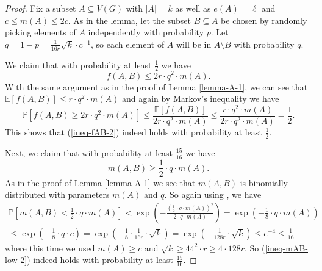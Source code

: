 \begin{proof}Fix a subset $A\subseteq V(G)$ with $\vert A\vert=k$ as well as $e(A)=\ell$ and $c\leq m(A)\leq 2c$. As in the lemma, let the subset $B\subseteq A$ be chosen by randomly picking elements of $A$ independently with probability $p$. Let $q=1-p=\frac{1}{16r}\sqrt{k}\cdot c^{-1}$, so each element of $A$ will be in $A\setminus B$ with probability $q$.

We claim that with probability at least $\frac{1}{2}$ we have
\begin{equation}\label{ineq-fAB-2}
f(A,B)\leq 2r\cdot q^2 \cdot m(A).
\end{equation}
With the same argument as in the proof of Lemma \ref{lemma-A-1}, we can see that $\mathbb{E}[f(A,B)]\leq r\cdot q^2\cdot m(A)$ and again by Markov's inequality we have
\[\mathbb{P}[f(A,B)\geq 2r\cdot q^2\cdot m(A)]\leq \frac{\mathbb{E}[f(A,B)]}{2r\cdot q^2\cdot m(A)}\leq \frac{r\cdot q^2\cdot m(A)}{2r\cdot q^2\cdot m(A)}=\frac{1}{2}.\]
This shows that (\ref{ineq-fAB-2}) indeed holds with probability at least $\frac{1}{2}$.

Next, we claim that with probability at least $\frac{15}{16}$ we have
\begin{equation}\label{ineq-mAB-low-2}
m(A,B)\geq \frac{1}{2}\cdot q \cdot m(A).
\end{equation}
As in the proof of Lemma \ref{lemma-A-1} we see that $m(A,B)$ is binomially distributed with parameters $m(A)$ and $q$. So again using \cite[Theorem A.1.13]{alon-spencer}, we have 
\begin{multline*}
\mathbb{P}\left[m(A,B)< \frac{1}{2}\cdot q \cdot m(A)\right]<\exp\left(-\frac{\left(\frac{1}{2}\cdot q \cdot m(A)\right)^2}{2\cdot q\cdot m(A)}\right)=\exp\left(-\frac{1}{8}\cdot q\cdot m(A)\right)\\
\leq\exp\left(-\frac{1}{8}\cdot q\cdot c\right)=\exp\left(-\frac{1}{8}\cdot \frac{1}{16r}\cdot \sqrt{k}\right)=\exp\left(-\frac{1}{128r}\cdot \sqrt{k}\right)\leq e^{-4}\leq \frac{1}{16}
\end{multline*}
where this time we used $m(A)\geq c$ and $\sqrt{k}\geq 44^2 \cdot r\geq 4\cdot 128r$. So (\ref{ineq-mAB-low-2}) indeed holds with probability at least $\frac{15}{16}$.


\end{proof}

